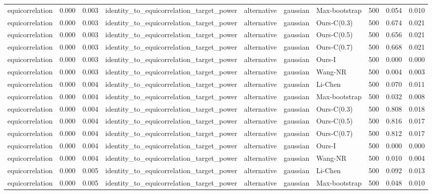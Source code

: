 \begin{tabular}{lrrllllrrr}
equicorrelation & 0.000 & 0.003 & identity\_to\_equicorrelation\_target\_power & alternative & gaussian & Max-bootstrap & 500 & 0.054 & 0.010 \\
equicorrelation & 0.000 & 0.003 & identity\_to\_equicorrelation\_target\_power & alternative & gaussian & Ours-C(0.3) & 500 & 0.674 & 0.021 \\
equicorrelation & 0.000 & 0.003 & identity\_to\_equicorrelation\_target\_power & alternative & gaussian & Ours-C(0.5) & 500 & 0.656 & 0.021 \\
equicorrelation & 0.000 & 0.003 & identity\_to\_equicorrelation\_target\_power & alternative & gaussian & Ours-C(0.7) & 500 & 0.668 & 0.021 \\
equicorrelation & 0.000 & 0.003 & identity\_to\_equicorrelation\_target\_power & alternative & gaussian & Ours-I & 500 & 0.000 & 0.000 \\
equicorrelation & 0.000 & 0.003 & identity\_to\_equicorrelation\_target\_power & alternative & gaussian & Wang-NR & 500 & 0.004 & 0.003 \\
equicorrelation & 0.000 & 0.004 & identity\_to\_equicorrelation\_target\_power & alternative & gaussian & Li-Chen & 500 & 0.070 & 0.011 \\
equicorrelation & 0.000 & 0.004 & identity\_to\_equicorrelation\_target\_power & alternative & gaussian & Max-bootstrap & 500 & 0.032 & 0.008 \\
equicorrelation & 0.000 & 0.004 & identity\_to\_equicorrelation\_target\_power & alternative & gaussian & Ours-C(0.3) & 500 & 0.808 & 0.018 \\
equicorrelation & 0.000 & 0.004 & identity\_to\_equicorrelation\_target\_power & alternative & gaussian & Ours-C(0.5) & 500 & 0.816 & 0.017 \\
equicorrelation & 0.000 & 0.004 & identity\_to\_equicorrelation\_target\_power & alternative & gaussian & Ours-C(0.7) & 500 & 0.812 & 0.017 \\
equicorrelation & 0.000 & 0.004 & identity\_to\_equicorrelation\_target\_power & alternative & gaussian & Ours-I & 500 & 0.000 & 0.000 \\
equicorrelation & 0.000 & 0.004 & identity\_to\_equicorrelation\_target\_power & alternative & gaussian & Wang-NR & 500 & 0.010 & 0.004 \\
equicorrelation & 0.000 & 0.005 & identity\_to\_equicorrelation\_target\_power & alternative & gaussian & Li-Chen & 500 & 0.092 & 0.013 \\
equicorrelation & 0.000 & 0.005 & identity\_to\_equicorrelation\_target\_power & alternative & gaussian & Max-bootstrap & 500 & 0.048 & 0.010 \\

\end{tabular}
